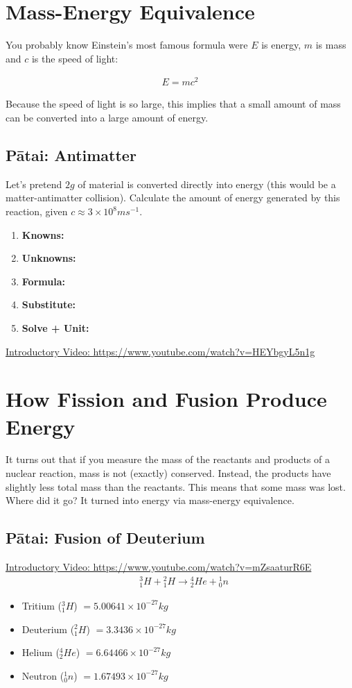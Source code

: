 \documentclass[12pt]{report}
\newcommand\kufss{
	\begin{enumerate}[itemsep=15pt,label=,leftmargin=0.5cm]
		\item \textbf{Knowns:}
		\item \textbf{Unknowns:}
		\item \textbf{Formula:}
		\item \textbf{Substitute:}
		\item \textbf{Solve + Unit:}
	\end{enumerate}
}
\begin{document}
{\section{Mass-Energy Equivalence}
You probably know Einstein's most famous formula were $E$ is energy, $m$ is mass and $c$ is the speed of light:

\begin{align*}
	E=mc^{2}
\end{align*}

Because the speed of light is so large, this implies that a small amount of mass can be converted into a large amount of energy.

\subsection{Pātai: Antimatter}
Let's pretend $2g$ of material is converted directly into energy (this would be a matter-antimatter collision). Calculate the amount of energy generated by this reaction, given $c\approx3\times10^{8}ms^{-1}$.
\kufss

\noindent\href{https://www.youtube.com/watch?v=HEYbgyL5n1g}{Introductory Video: https://www.youtube.com/watch?v=HEYbgyL5n1g}

\section{How Fission and Fusion Produce Energy}
It turns out that if you measure the mass of the reactants and products of a nuclear reaction, mass is not (exactly) conserved. Instead, the products have slightly less total mass than the reactants. This means that some mass was lost. Where did it go? It turned into energy via mass-energy equivalence.

\subsection{Pātai: Fusion of Deuterium}
\noindent\href{https://www.youtube.com/watch?v=mZsaaturR6E}{Introductory Video: https://www.youtube.com/watch?v=mZsaaturR6E}
\begin{align*}
    & {}^{3}_{1}H + {}^{2}_{1}H \rightarrow {}^{4}_{2}He + {}^{1}_{0}n
\end{align*}

\begin{itemize}
	\item Tritium (${}^{3}_{1}H$) $= 5.00641 \times 10^{-27} kg$
	\item Deuterium (${}^{2}_{1}H$) $= 3.3436 \times 10^{-27} kg$
	\item Helium (${}^{4}_{2}He$) $= 6.64466 \times 10^{-27} kg$
	\item Neutron (${}^{1}_{0}n$) $= 1.67493 \times 10^{-27} kg$
\end{itemize}

}
\end{document}
